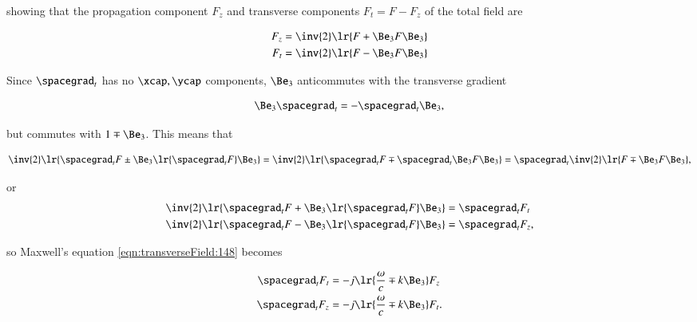 showing that the propagation component \( F_z \) and transverse components \( F_t = F - F_z \) of the total field are

\begin{dmath}\label{eqn:transverseField:128}
\begin{aligned}
F_z &= \inv{2} \lr{ F + \Be_3 F \Be_3 } \\
F_t &= \inv{2} \lr{ F - \Be_3 F \Be_3 } \\
\end{aligned}
\end{dmath}

Since \( \spacegrad_t \) has no \( \xcap, \ycap \) components, \( \Be_3 \) anticommutes with the transverse gradient

\begin{dmath}\label{eqn:transverseField:168}
\Be_3 \spacegrad_t = - \spacegrad_t \Be_3,
\end{dmath}

but commutes with \( 1 \mp \Be_3 \).
This means that

\begin{dmath}\label{eqn:transverseField:188}
\inv{2} \lr{ \spacegrad_t F \pm \Be_3 \lr{ \spacegrad_t F } \Be_3 }
=
\inv{2} \lr{ \spacegrad_t F \mp \spacegrad_t \Be_3 F \Be_3 }
=
\spacegrad_t
\inv{2} \lr{ F \mp \Be_3 F \Be_3 },
\end{dmath}

or
\begin{dmath}\label{eqn:transverseField:208}
\begin{aligned}
\inv{2} \lr{ \spacegrad_t F + \Be_3 \lr{ \spacegrad_t F } \Be_3 } &= \spacegrad_t F_t \\
\inv{2} \lr{ \spacegrad_t F - \Be_3 \lr{ \spacegrad_t F } \Be_3 } &= \spacegrad_t F_z,
\end{aligned}
\end{dmath}

so Maxwell's equation \cref{eqn:transverseField:148} becomes

\begin{dmath}\label{eqn:transverseField:228}
\begin{aligned}
\spacegrad_t F_t &= - j \lr{ \frac{\omega}{c} \mp k \Be_3 } F_z \\
\spacegrad_t F_z &= - j \lr{ \frac{\omega}{c} \mp k \Be_3 } F_t.
\end{aligned}
\end{dmath}

